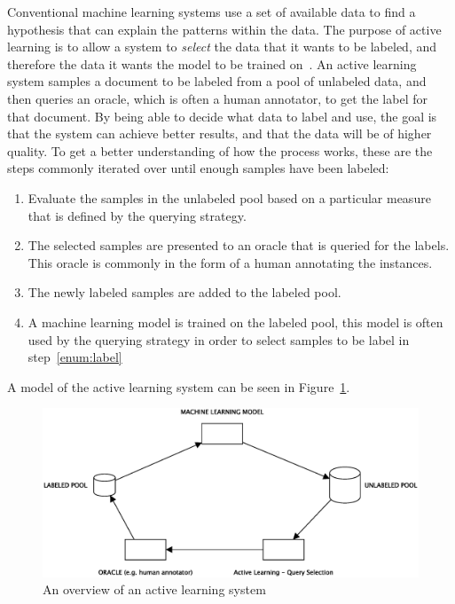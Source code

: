 Conventional machine learning systems use a set of available data to find a hypothesis that can explain the patterns within the data.
The purpose of active learning is to allow a system to \textit{select} the data that it wants to be labeled, and therefore the data it wants the model to be trained on~\cite{settles2012active}.
An active learning system samples a document to be labeled from a pool of unlabeled data, and then queries an oracle, which is often a human annotator, to get the label for that document.
By being able to decide what data to label and use, the goal is that the system can achieve better results, and that the data will be of higher quality.
To get a better understanding of how the process works, these are the steps commonly iterated over until enough samples have been labeled:
\begin{enumerate}
    \item Evaluate the samples in the unlabeled pool based on a particular measure that is defined by the querying strategy.
    \item The selected samples are presented to an oracle that is queried for the labels. This oracle is commonly in the form of a human annotating the instances. \label{enum:label}
    \item The newly labeled samples are added to the labeled pool.
    \item A machine learning model is trained on the labeled pool, this model is often used by the querying strategy in order to select samples to be label in step~\ref{enum:label}
\end{enumerate}
A model of the active learning system can be seen in Figure~\ref{fig:active-learning-model}.
\begin{figure}[!ht]
    \centering
    \includegraphics[scale=0.5]{figures/active-learning-model.eps}
    \caption{An overview of an active learning system}
    \label{fig:active-learning-model}
\end{figure}


